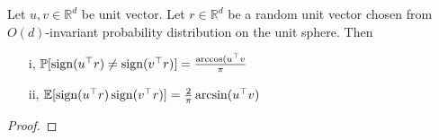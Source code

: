 \begin{lemma}
	Let $u,v\in\mathbb{R}^d$ be unit vector. Let $r\in\mathbb{R}^d$ be a random unit vector chosen from $O(d)$-invariant probability distribution on the unit sphere. Then
	\begin{enumerate}
		\item[i,] $\mathbb{P}[\operatorname{sign}(u^\top r)\neq\operatorname{sign}(v^\top r)]=\frac{\arccos(u^\top v}{\pi}$
		\item[ii,] $\mathbb{E}[\operatorname{sign}(u^\top r)\operatorname{sign}(v^\top r)]=\frac{2}{\pi}\arcsin(u^\top v)$
	\end{enumerate}
\end{lemma}
\begin{proof}

\end{proof}